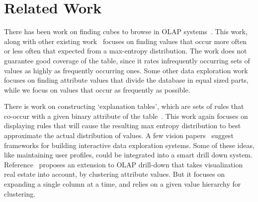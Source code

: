 
\section{Related Work}\label{sec:related}


There has been work on finding cubes to browse in OLAP systems~\cite{Sarawagi:2001:UMA:767141.767148, Sarawagi00user-adaptiveexploration, Sarawagi98discovery-drivenexploration}. This work, along with other existing work~\cite{Mampaey:2011:TMI:2020408.2020499} focuses on finding values that occur more often or less often that expected from a max-entropy distribution. The work does not guarantee good coverage of the table, since it rates infrequently occurring sets of values as highly as frequently occurring ones. Some other data exploration work~\cite{sellam:meet} focuses on finding attribute values that divide the database in equal sized parts, while we focus on values that occur as frequently as possible. 

There is work on constructing `explanation tables', which are sets of rules that co-occur with a given binary attribute of the table~\cite{DBLP:journals/pvldb/GebalyAGKS14}. This work again focuses on displaying rules that will cause the resulting max entropy distribution to best approximate the actual distribution of values. A few vision papers~\cite{data-deluge, cetintemel2013query} suggest frameworks for building interactive data exploration systems. Some of these ideas, like maintaining user profiles, could be integrated into a smart drill down system. Reference~\cite{DBLP:conf/edbt/CandanCQS09} proposes an extension to OLAP drill-down that takes visualization real estate into account, by clustering attribute values. But it focuses on expanding a single column at a time, and relies on a given value hierarchy for clustering.

